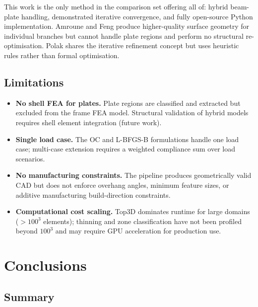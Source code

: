 \documentclass[11pt,a4paper]{article}
\begin{document}
This work is the only method in the comparison set offering all of:
hybrid beam-plate handling, demonstrated iterative convergence, and
fully open-source Python implementation.
Amroune \cite{amroune2021} and Feng \cite{feng2025} produce higher-quality
surface geometry for individual branches but cannot handle plate regions and
perform no structural re-optimisation.
Polak \cite{polak2023} shares the iterative refinement concept but uses
heuristic rules rather than formal optimisation.

\subsection{Limitations}
\label{subsec:limitations}

\begin{itemize}
    \item \textbf{No shell FEA for plates.}
          Plate regions are classified and extracted but excluded from the
          frame FEA model.
          Structural validation of hybrid models requires shell element
          integration (future work).

    \item \textbf{Single load case.}
          The OC and L-BFGS-B formulations handle one load case; multi-case
          extension requires a weighted compliance sum over load scenarios.

    \item \textbf{No manufacturing constraints.}
          The pipeline produces geometrically valid CAD but does not enforce
          overhang angles, minimum feature sizes, or additive manufacturing
          build-direction constraints.

    \item \textbf{Computational cost scaling.}
          Top3D dominates runtime for large domains ($>100^3$ elements);
          thinning and zone classification have not been profiled beyond
          $100^3$ and may require GPU acceleration for production use.
\end{itemize}

\section{Conclusions}
\label{sec:conclusions}

\subsection{Summary}
\end{document}
